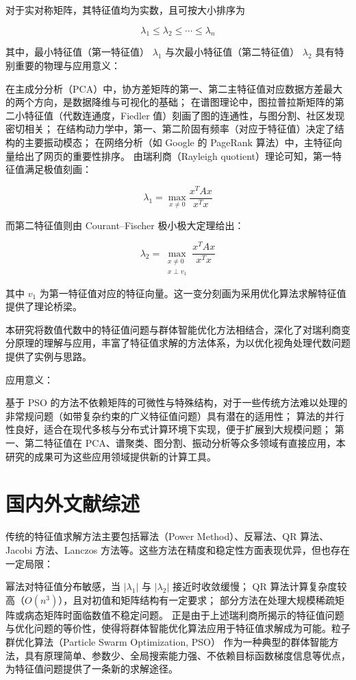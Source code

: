 对于实对称矩阵，其特征值均为实数，且可按大小排序为

$$\lambda_1 \leq \lambda_2 \leq \cdots \leq \lambda_n$$

其中，最小特征值（第一特征值） $\lambda_1$ 与次最小特征值（第二特征值） $\lambda_2$ 具有特别重要的物理与应用意义：

在主成分分析（PCA）中，协方差矩阵的第一、第二主特征值对应数据方差最大的两个方向，是数据降维与可视化的基础；
在谱图理论中，图拉普拉斯矩阵的第二小特征值（代数连通度，Fiedler 值）刻画了图的连通性，与图分割、社区发现密切相关；
在结构动力学中，第一、第二阶固有频率（对应于特征值）决定了结构的主要振动模态；
在网络分析（如 Google 的 PageRank 算法）中，主特征向量给出了网页的重要性排序。
由瑞利商（Rayleigh quotient）理论可知，第一特征值满足极值刻画：

$$\lambda_1 = \max_{x \neq 0} \frac{x^T A x}{x^T x}$$

而第二特征值则由 Courant–Fischer 极小极大定理给出：

$$\lambda_2 = \max_{\substack{x \neq 0 \\ x \perp v_1}} \frac{x^T A x}{x^T x}$$

其中 $v_1$ 为第一特征值对应的特征向量。这一变分刻画为采用优化算法求解特征值提供了理论桥梁。

本研究将数值代数中的特征值问题与群体智能优化方法相结合，深化了对瑞利商变分原理的理解与应用，丰富了特征值求解的方法体系，为以优化视角处理代数问题提供了实例与思路。

应用意义：

基于 PSO 的方法不依赖矩阵的可微性与特殊结构，对于一些传统方法难以处理的非常规问题（如带复杂约束的广义特征值问题）具有潜在的适用性；
算法的并行性良好，适合在现代多核与分布式计算环境下实现，便于扩展到大规模问题；
第一、第二特征值在 PCA、谱聚类、图分割、振动分析等众多领域有直接应用，本研究的成果可为这些应用领域提供新的计算工具。

\section{国内外文献综述}


传统的特征值求解方法主要包括幂法（Power Method）、反幂法、QR 算法、Jacobi 方法、Lanczos 方法等。这些方法在精度和稳定性方面表现优异，但也存在一定局限：

幂法对特征值分布敏感，当 $|\lambda_1|$ 与 $|\lambda_2|$ 接近时收敛缓慢；
QR 算法计算复杂度较高（$O(n^3)$），且对初值和矩阵结构有一定要求；
部分方法在处理大规模稀疏矩阵或病态矩阵时面临数值不稳定问题。
正是由于上述瑞利商所揭示的特征值问题与优化问题的等价性，使得将群体智能优化算法应用于特征值求解成为可能。粒子群优化算法（Particle Swarm Optimization, PSO） 作为一种典型的群体智能方法，具有原理简单、参数少、全局搜索能力强、不依赖目标函数梯度信息等优点，为特征值问题提供了一条新的求解途径。

